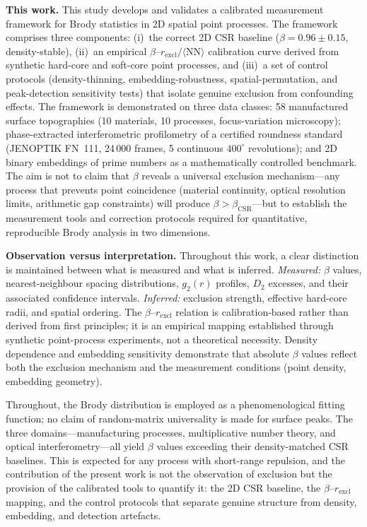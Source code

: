\documentclass[final,1p,times]{elsarticle}
\theoremstyle{definition}
\begin{document}
\textbf{This work.} This study develops and validates a calibrated
measurement framework for Brody statistics in 2D spatial point
processes. The framework comprises three components: (i)~the correct
2D CSR baseline ($\beta=0.96\pm0.15$, density-stable),
(ii)~an empirical $\beta$--$r_{\text{excl}}/\langle\text{NN}\rangle$
calibration curve derived from synthetic hard-core and soft-core
point processes, and (iii)~a set of control protocols
(density-thinning, embedding-robustness, spatial-permutation,
and peak-detection sensitivity tests) that isolate genuine exclusion
from confounding effects. The framework is demonstrated on three
data classes: 58 manufactured surface topographies (10 materials,
10 processes, focus-variation microscopy); phase-extracted
interferometric profilometry of a certified roundness standard
(JENOPTIK FN~111, 24\,000 frames, 5 continuous $400^\circ$
revolutions); and 2D binary embeddings of prime numbers as a
mathematically controlled benchmark. The aim is not to claim that
$\beta$ reveals a universal exclusion mechanism---any process that
prevents point coincidence (material continuity, optical resolution
limits, arithmetic gap constraints) will produce $\beta>\beta_{\text{CSR}}$---but
to establish the measurement tools and correction protocols required
for quantitative, reproducible Brody analysis in two dimensions.

\textbf{Observation versus interpretation.} Throughout this work, a
clear distinction is maintained between what is measured and what is
inferred. \emph{Measured:} $\beta$ values, nearest-neighbour spacing
distributions, $g_2(r)$ profiles, $D_2$ excesses, and their associated
confidence intervals. \emph{Inferred:} exclusion strength, effective
hard-core radii, and spatial ordering. The $\beta$--$r_{\text{excl}}$
relation is calibration-based rather than derived from first
principles; it is an empirical mapping established through synthetic
point-process experiments, not a theoretical necessity. Density
dependence and embedding sensitivity demonstrate that absolute
$\beta$ values reflect both the exclusion mechanism and the
measurement conditions (point density, embedding geometry).

Throughout, the Brody distribution is employed as a phenomenological
fitting function; no claim of random-matrix universality is made for
surface peaks. The three domains---manufacturing processes,
multiplicative number theory, and optical interferometry---all yield
$\beta$ values exceeding their density-matched CSR baselines. This is
expected for any process with short-range repulsion, and the
contribution of the present work is not the observation of exclusion
but the provision of the calibrated tools to quantify it:
the 2D CSR baseline, the $\beta$--$r_{\text{excl}}$ mapping, and
the control protocols that separate genuine structure from
density, embedding, and detection artefacts.
\end{document}
